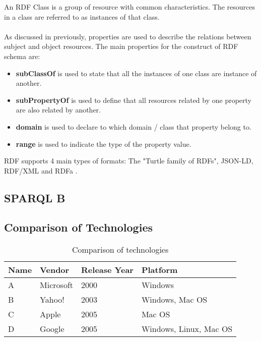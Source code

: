 An RDF Class is a group of resource with common characteristics. The resources in a class are referred to as instances of that class.
\\
\\
As discussed in previously, properties are used to describe the relations between subject and object resources.
The main properties for the construct of RDF schema are: 
\begin{itemize}
	\item \textbf{subClassOf} is used to state that all the instances of one class are instance of another.
	\item \textbf{subPropertyOf} is used to define that all resources related by one property are also related by another.
	\item \textbf{domain} is used to declare to which domain / class that property belong to.
	\item \textbf{range} is used to indicate the type of the property value.
\end{itemize}

RDF supports 4 main types of formats: The "Turtle family of RDFs", JSON-LD, RDF/XML and RDFa \cite{rdf}.



\subsection{SPARQL B\label{sec:bbb}}



\subsection{Comparison of Technologies\label{sec:comp}}

\begin{table}[htb]
\centering
\begin{tabular}[t]{|l|l|l|l|}
\hline
Name & Vendor & Release Year & Platform \\
\hline
\hline
A & Microsoft & 2000 & Windows \\
\hline
B & Yahoo! & 2003 & Windows, Mac OS \\
\hline
C & Apple & 2005 & Mac OS \\
\hline
D & Google & 2005 & Windows, Linux, Mac OS \\
\hline
\end{tabular}
\caption{Comparison of technologies}
\label{tab:enghistory}
\end{table}

